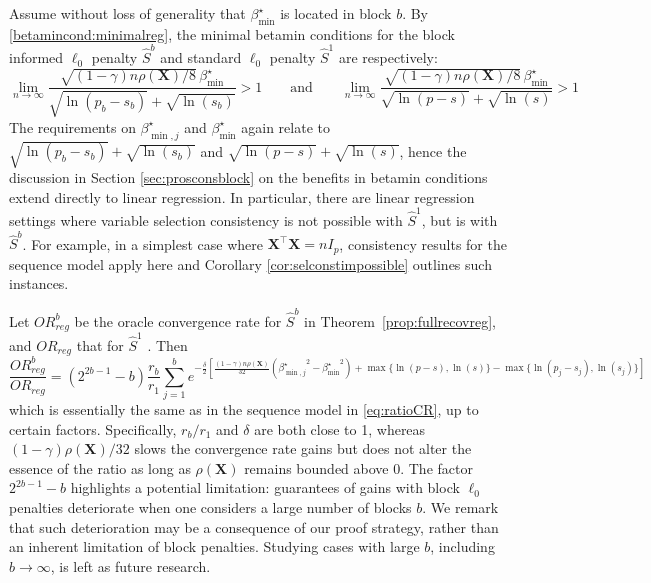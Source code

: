 \documentclass[aos]{imsart}
\theoremstyle{plain}
\newcommand{\bs}{\boldsymbol}
\begin{document}
\noindent Assume without loss of generality that $\beta_{\min}^{\star}$ is located in block $b$.  By \eqref{betamincond:minimalreg}, the minimal betamin conditions for the block informed $\ell_0$ penalty $\hat{S}^b$ and standard $\ell_0$ penalty $\hat{S}^1$ are respectively: 
$$\lim_{n\to \infty}\frac{\sqrt{(1-\gamma) n\rho(\bs X)/8}\,{\beta_{\min}^{\star}}}{\sqrt{\ln(p_b-s_b)} + \sqrt{\ln(s_b)}} >1 \qquad \mbox{and} \qquad \lim_{n\to \infty}\frac{\sqrt{(1-\gamma) n\rho(\bs X)/8}\,{\beta_{\min}^{\star}}}{\sqrt{\ln(p-s)} + \sqrt{\ln(s)}} >1$$
The requirements on $\beta_{\min,j}^\star$ and $\beta_{\min}^\star$ again relate to
$\sqrt{\ln(p_b-s_b)} + \sqrt{\ln(s_b)}$ and $\sqrt{\ln(p-s)} + \sqrt{\ln(s)}$, hence the discussion in Section \ref{sec:prosconsblock} on the benefits in betamin conditions extend directly to linear regression.
In particular, there are linear regression settings where variable selection consistency is not possible with $\hat{S}^1$, but is with $\hat{S}^b$. For example, in a simplest case where $\bs X^\top \bs X=n I_p$, consistency results for the sequence model apply here
and Corollary \ref{cor:selconstimpossible} outlines such instances.

Let ${OR}^b_{reg}$ be the oracle convergence rate for $\hat{S}^{b}$ in Theorem~\ref{prop:fullrecovreg}, and ${OR}_{reg}$ that for $\hat{S}^{1}$ . Then
\begin{equation*}
    \frac{{OR}^b_{reg}}{{OR}_{reg}}=(2^{2b-1}-b)\frac{r_b}{r_1}\sum_{j=1}^be^{-\frac{\delta}{2}\left[\frac{(1-\gamma) n\rho(\bs X)}{32}\left({\beta^\star_{\min,j}}^2-{\beta_{\min}^\star}^2\right)+\max\{\ln(p-s),\ln(s)\}-\max\{\ln(p_j-s_j),\ln(s_j)\}\right]}
\end{equation*}
which is essentially the same as in the sequence model %
in \eqref{eq:ratioCR}, up to certain %
factors. 
Specifically, $r_b/r_1$ and $\delta$ are both close to 1, whereas $(1-\gamma) \rho(\bs X)/32$ slows the convergence rate gains %
but does not alter the essence of the ratio %
as long as $\rho(\bs X)$ remains bounded above 0. The factor $2^{2b-1}-b$ highlights a potential limitation: guarantees of gains with block $\ell_0$ penalties deteriorate when one considers a large number of blocks $b$.
We remark that such deterioration may be a consequence of our proof strategy, rather than an inherent limitation of block penalties. Studying cases with large $b$, including $b \to \infty$, is left as future research.
\end{document}
